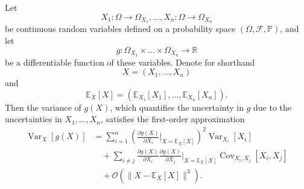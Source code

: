 \begin{theorem}
	\label{theorem:error_propagation}
	Let
	\begin{equation}
		X_1\colon\Omega \to \Omega_{X_1}, \dots, X_n\colon\Omega \to \Omega_{X_n}
	\end{equation}
	be continuous random variables defined on a probability space $(\Omega, \mathcal{F}, \mathbb{P})$, and let
	\begin{equation}
		g\colon\Omega_{X_1} \times \dots \times \Omega_{X_n} \to \mathbb{R}
	\end{equation}
	be a differentiable function of these variables. Denote for shorthand
	\begin{equation}
		X = (X_1, \dots, X_n)
	\end{equation}
	and
	\begin{equation}
		\mathbb{E}_X[X] = (\mathbb{E}_{X_1}[X_1], \dots, \mathbb{E}_{X_n}[X_n]).
	\end{equation}
	Then the variance of $g(X)$, which quantifies the uncertainty in $g$ due to the uncertainties in $X_1, \dots, X_n$, satisfies the first-order approximation
	\begin{equation}
		\begin{split}
			\operatorname{Var}_X[g(X)] &= \sum_{i=1}^n \left(\frac{\partial g(X)}{\partial X_i}\bigg|_{X = \mathbb{E}_X[X]}\right)^{\!2} \operatorname{Var}_{X_i}[X_i]
			\\&\quad+ \sum_{i \neq j} \frac{\partial g(X)}{\partial X_i}\frac{\partial g(X)}{\partial X_j}\bigg|_{X = \mathbb{E}_X[X]} \operatorname{Cov}_{X_i,X_j}[X_i, X_j]\\
			&\quad+ \mathcal{O}(\|X - \mathbb{E}_X[X]\|^3).
		\end{split}
		\label{eq:var_approx}
	\end{equation}
\end{theorem}

